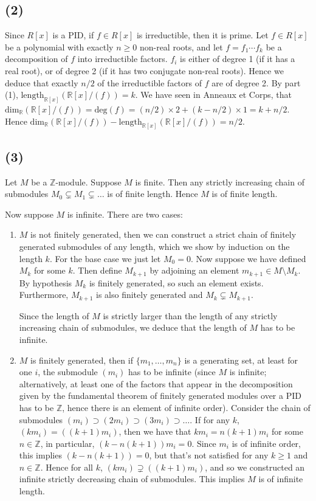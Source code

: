 \documentclass{article}
\newcommand{\R}{\mathbb{R}}
\newcommand{\Z}{\mathbb{Z}}
\begin{document}
\subsection*{(2)}

Since $R[x]$ is a PID, if $f \in R[x]$ is irreductible,
then it is prime. Let $f \in R[x]$ be a polynomial with exactly
$n\geq 0$ non-real roots, and let $f=f_1 \cdots f_k$ be a
decomposition of $f$ into irreductible factors.
$f_i$ is either of degree 1 (if it has a real root),
or of degree 2 (if it has two conjugate non-real roots).
Hence we deduce that exactly $n/2$ of the irreductible 
factors of $f$ are of degree 2.
By part (1), $\mathrm{length}_{\R[x]}\left(\R[x]/(f)\right)
= k$. We have seen in Anneaux et Corps, that
$\mathrm{dim}_\R\left(\R[x]/(f)\right) = \mathrm{deg}(f) = 
(n/2)\times2 + (k - n/2)\times1 = k + n/2$.
Hence $\mathrm{dim}_\R\left(\R[x]/(f)\right) -
\mathrm{length}_{\R[x]}\left(\R[x]/(f)\right) = n/2$.

\subsection*{(3)}

Let $M$ be a $\Z$-module. Suppose $M$ is finite. Then any strictly
increasing chain of submodules $M_0 \subsetneq M_1 \subsetneq 
\dots$ is of finite length. Hence $M$ is of finite length.

Now suppose $M$ is infinite. There are two cases:
\begin{enumerate}
	\item $M$ is not finitely generated, then we can construct a
		strict chain of finitely generated submodules of any length,
		which we show by induction on the length $k$.
		For the base case we just let
		$M_0 = 0$. Now suppose we have defined $M_k$ for some $k$.
		Then define $M_{k+1}$ by adjoining an element
		$m_{k+1} \in M\setminus M_k$. By hypothesis $M_k$ is finitely
		generated, so such an element exists. Furthermore,
		$M_{k+1}$ is also finitely generated and
		$M_k \subsetneq M_{k+1}$.

		Since the length of $M$ is strictly larger than the length
		of any strictly increasing chain of submodules, we deduce
		that the length of $M$ has to be infinite.
	\item $M$ is finitely generated, then if $\{m_1, \dots, m_n\}$
		is a generating set, at least for one $i$, the submodule
		$(m_i)$ has to be infinite (since $M$ is infinite;
		alternatively, at least one of the factors that appear in the
		decomposition given by the fundamental theorem of finitely
		generated modules over a PID has to be $\Z$, hence there is
		an element of infinite order).
		Consider the chain of submodules
		$(m_i) \supset (2m_i) \supset (3m_i) \supset \dots$.
		If for any $k$, $(km_i) = ((k+1)m_i)$, then we have that
		$km_i = n(k+1)m_i$ for some $n \in \Z$, in particular, 
		$(k - n(k+1))m_i = 0$. Since $m_i$ is of infinite order, this
		implies $(k - n(k + 1)) = 0$, but that's not satisfied for
		any $k \geq 1$ and $n \in \Z$. Hence for all $k$,
		$(km_i) \supsetneq ((k+1)m_i)$, and so we constructed an
		infinite strictly decreasing chain of submodules.
		This implies $M$ is of infinite length.	
\end{enumerate}
\end{document}
